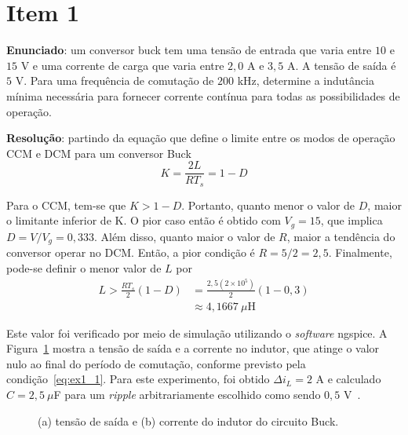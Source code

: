 \section*{Item 1}\label{it:1}

\textbf{Enunciado}: um conversor buck tem uma tensão de entrada que varia entre $10$ e $15$ V e uma corrente de carga que varia entre $2{,}0$ A e $3{,}5$ A. A tensão de saída é $5$ V. Para uma frequência de comutação de $200$ kHz, determine a indutância mínima necessária para fornecer corrente contínua para todas as possibilidades de operação.

\medskip
\textbf{Resolução}: partindo da equação que define o limite entre os modos de operação CCM e DCM para um conversor Buck \cite{Eri:20}
\begin{equation}
    K = \frac{2L}{RT_s} = 1 - D
\end{equation}

Para o CCM, tem-se que $K > 1-D$. Portanto, quanto menor o valor de $D$, maior o limitante inferior de K. O pior caso então é obtido com $V_g = 15$, que implica $D = V/V_g = 0{,}333$. Além disso, quanto maior o valor de $R$, maior a tendência do conversor operar no DCM. Então, a pior condição é $R = 5/2 = 2{,}5$. Finalmente, pode-se definir o menor valor de $L$ por
\begin{equation}\label{eq:ex1_1}
\begin{aligned}
    L > \frac{RT_s}{2}(1-D) &= \frac{2{,}5(2\times10^5)}{2}(1-0{,}3) \\
    &\approx 4{,}1667 \ \mu\mathrm{H}
\end{aligned}
\end{equation}

Este valor foi verificado por meio de simulação utilizando o \textit{software} ngspice. A Figura~\ref{fig:ex1} mostra a tensão de saída e a corrente no indutor, que atinge o valor nulo ao final do período de comutação, conforme previsto pela condição~\eqref{eq:ex1_1}. Para este experimento, foi obtido $\Delta i_L = 2$ A e calculado $C = 2{,}5 \ \mu$F para um \textit{ripple} arbitrariamente escolhido como sendo $0{,}5$ V~\cite{codm_ex1}.
\begin{figure}[htb!]
    \centering
    
    \caption{(a) tensão de saída e (b) corrente do indutor do circuito Buck.}
    \label{fig:ex1}
\end{figure}
